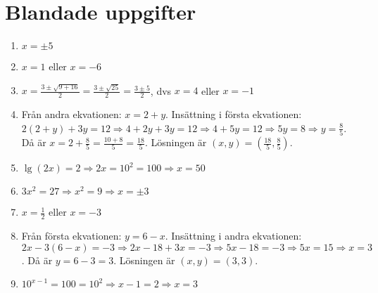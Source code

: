 \documentclass[a4paper,11pt]{article}
\begin{document}
\section{Blandade uppgifter}
\begin{enumerate}[label=\textbf{\arabic*.}]
    \item $x = \pm 5$
    \item $x = 1$ eller $x = -6$
    \item $x = \frac{3 \pm \sqrt{9+16}}{2} = \frac{3 \pm \sqrt{25}}{2} = \frac{3 \pm 5}{2}$, dvs $x = 4$ eller $x = -1$
    \item Från andra ekvationen: $x = 2 + y$. Insättning i första ekvationen: $2(2+y) + 3y = 12 \Rightarrow 4 + 2y + 3y = 12 \Rightarrow 4 + 5y = 12 \Rightarrow 5y = 8 \Rightarrow y = \frac{8}{5}$. Då är $x = 2 + \frac{8}{5} = \frac{10+8}{5} = \frac{18}{5}$. Lösningen är $(x,y) = (\frac{18}{5}, \frac{8}{5})$.
    \item $\lg (2x) = 2 \Rightarrow 2x = 10^2 = 100 \Rightarrow x = 50$
    \item $3x^2 = 27 \Rightarrow x^2 = 9 \Rightarrow x = \pm 3$
    \item $x = \frac{1}{2}$ eller $x = -3$
    \item Från första ekvationen: $y = 6 - x$. Insättning i andra ekvationen: $2x - 3(6-x) = -3 \Rightarrow 2x - 18 + 3x = -3 \Rightarrow 5x - 18 = -3 \Rightarrow 5x = 15 \Rightarrow x = 3$. Då är $y = 6 - 3 = 3$. Lösningen är $(x,y) = (3,3)$.
    \item $10^{x-1} = 100 = 10^2 \Rightarrow x-1 = 2 \Rightarrow x = 3$
\end{enumerate}
\end{document}
